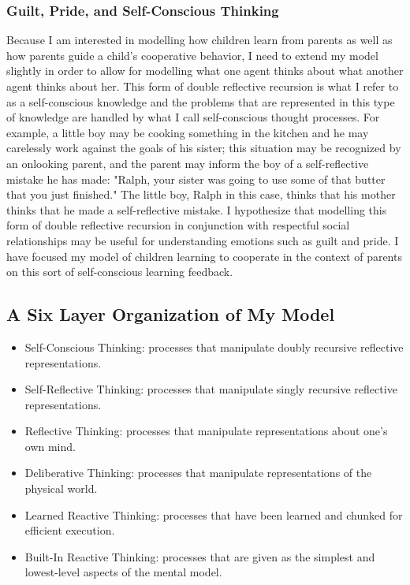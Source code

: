 \subsubsection{Guilt, Pride, and Self-Conscious Thinking}

Because I am interested in modelling how children learn from parents
as well as how parents guide a child's cooperative behavior, I need
to extend my model slightly in order to allow for modelling what one
agent thinks about what another agent thinks about her. This form of
double reflective recursion is what I refer to as a self-conscious
knowledge and the problems that are represented in this type of
knowledge are handled by what I call self-conscious thought
processes. For example, a little boy may be cooking something in the
kitchen and he may carelessly work against the goals of his sister;
this situation may be recognized by an onlooking parent, and the
parent may inform the boy of a self-reflective mistake he has made:
"Ralph, your sister was going to use some of that butter that you just
finished." The little boy, Ralph in this case, thinks that his mother
thinks that he made a self-reflective mistake. I hypothesize that
modelling this form of double reflective recursion in conjunction with
respectful social relationships may be useful for understanding
emotions such as guilt and pride. I have focused my model of
children learning to cooperate in the context of parents on this sort
of self-conscious learning feedback.

\subsection{A Six Layer Organization of My Model}

\begin{itemize}
\item{Self-Conscious Thinking: processes that manipulate doubly recursive reflective representations.}
\item{Self-Reflective Thinking: processes that manipulate singly recursive reflective representations.}
\item{Reflective Thinking: processes that manipulate representations about one's own mind.}
\item{Deliberative Thinking: processes that manipulate representations of the physical world.}
\item{Learned Reactive Thinking: processes that have been learned and chunked for efficient execution.}
\item{Built-In Reactive Thinking: processes that are given as the simplest and lowest-level aspects of the mental model.}
\end{itemize}

